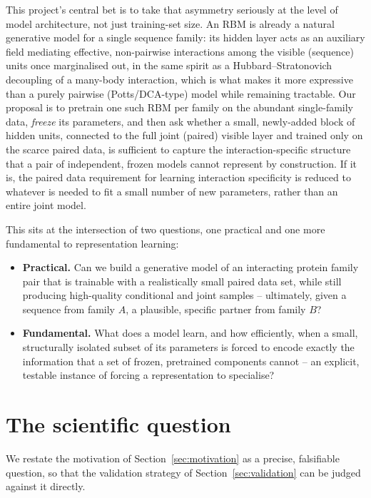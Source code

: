 \documentclass[11pt]{article}
\begin{document}
This project's central bet is to take that asymmetry seriously at the
level of model architecture, not just training-set size. An RBM is
already a natural generative model for a single sequence family: its
hidden layer acts as an auxiliary field mediating effective, non-pairwise
interactions among the visible (sequence) units once marginalised out, in
the same spirit as a Hubbard--Stratonovich decoupling of a many-body
interaction, which is what makes it more expressive than a purely
pairwise (Potts/DCA-type) model while remaining tractable. Our proposal
is to pretrain one such RBM per family on the abundant single-family
data, \emph{freeze} its parameters, and then ask whether a small,
newly-added block of hidden units, connected to the full joint (paired)
visible layer and trained only on the scarce paired data, is sufficient
to capture the interaction-specific structure that a pair of independent,
frozen models cannot represent by construction. If it is, the paired
data requirement for learning interaction specificity is reduced to
whatever is needed to fit a small number of new parameters, rather than
an entire joint model.

This sits at the intersection of two questions, one practical and one
more fundamental to representation learning:
\begin{itemize}
\item \textbf{Practical.} Can we build a generative model of an
interacting protein family pair that is trainable with a realistically
small paired data set, while still producing high-quality conditional and
joint samples -- ultimately, given a sequence from family $A$, a
plausible, specific partner from family $B$?
\item \textbf{Fundamental.} What does a model learn, and how efficiently,
when a small, structurally isolated subset of its parameters is forced to
encode exactly the information that a set of frozen, pretrained
components cannot -- an explicit, testable instance of forcing a
representation to specialise?
\end{itemize}

\section{The scientific question}
\label{sec:question}

We restate the motivation of Section~\ref{sec:motivation} as a precise,
falsifiable question, so that the validation strategy of
Section~\ref{sec:validation} can be judged against it directly.
\end{document}
